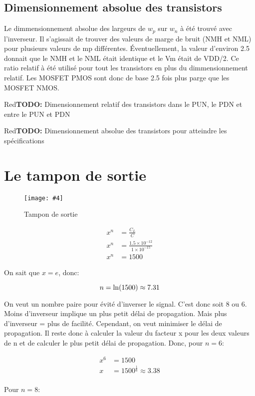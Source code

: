 \documentclass[a11paper]{article}
\newcommand{\todo}[1]{\begin{color}{Red}\textbf{TODO:} #1\end{color}}
\newcommand{\quickfig}[4]{
\begin{figure}[H]
  \centering
  \texttt{[image: \#4]}
  \caption{#1}
  \label{fig:#2}
\end{figure}
}
\begin{document}
\subsection{Dimensionnement absolue des transistors}
Le dimmensionnement absolue des largeurs de $w_p$ sur $w_n$ à été trouvé avec l'inverseur. Il s'agissait de trouver des valeurs de marge de bruit (NMH et NML) pour plusieurs valeurs de mp différentes.
Éventuellement, la valeur d'environ 2.5 donnait que le NMH et le NML était identique et le Vm était de VDD/2. Ce ratio relatif à été utilisé pour tout les transistors en plus du dimmensionnement relatif. 
Les MOSFET PMOS sont donc de base 2.5 fois plus parge que les MOSFET NMOS.


\todo{Dimensionnement relatif des transistors dans le PUN, le PDN et entre le PUN et PDN}
\todo{Dimensionnement absolue des transistors pour atteindre les spécifications}

\newpage
\section{Le tampon de sortie}
\quickfig{Tampon de sortie}{pad_buffer}{.5}{assets/pad_buffer.png}


\begin{align}
  x^n &= \frac{C_L}{C} \\
  x^n &= \frac{1.5\times10^{-12}}{1\times10^{-15}} \\
  x^n &= 1500
\end{align}

On sait que $x=e$, donc:

\begin{equation}
n=\ln(1500) \approx7.31 \\
\end{equation}

On veut un nombre paire pour évité d'inverser le signal. C'est donc soit $8$ ou $6$.
Moins d'inverseur implique un plus petit délai de propagation. Mais plus d'inverseur = plus de facilité. Cependant, on veut minimiser le délai de propagation.
Il reste donc à calculer la valeur du facteur x pour les deux valeurs de n et de calculer le plus petit délai de propagation.
Donc, pour $n=6$:

\begin{align}
  x^6 &=1500 \\
  x &=1500^{\frac{1}{6}} \approx3.38 \\
\end{align}

Pour $n=8$:
\end{document}
